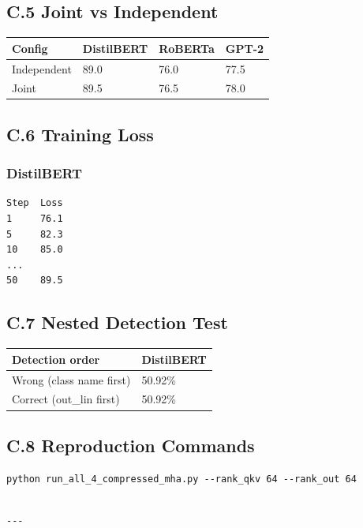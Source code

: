 \subsection{C.5 Joint vs Independent}

\begin{table}[H]
\centering
\small
\begin{tabular}{llll}
\toprule
\textbf{Config} & \textbf{DistilBERT} & \textbf{RoBERTa} & \textbf{GPT-2} \\
\midrule
Independent & 89.0 & 76.0 & 77.5 \\
Joint & 89.5 & 76.5 & 78.0 \\
\bottomrule
\end{tabular}
\end{table}

\subsection{C.6 Training Loss}

\subsubsection{DistilBERT}
\begin{lstlisting}
Step  Loss
1     76.1
5     82.3
10    85.0
...
50    89.5
\end{lstlisting}

\subsection{C.7 Nested Detection Test}

\begin{table}[H]
\centering
\small
\begin{tabular}{ll}
\toprule
\textbf{Detection order} & \textbf{DistilBERT} \\
\midrule
Wrong (class name first) & 50.92\% \\
Correct (out\_lin first) & 50.92\% \\
\bottomrule
\end{tabular}
\end{table}

\subsection{C.8 Reproduction Commands}

\begin{lstlisting}
python run_all_4_compressed_mha.py --rank_qkv 64 --rank_out 64
\end{lstlisting}
\begin{lstlisting}

---
\end{lstlisting}

